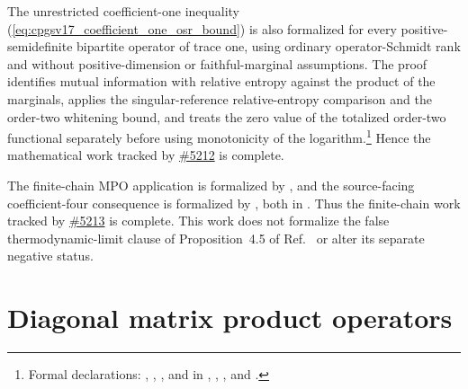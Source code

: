 \documentclass[11pt]{article}
\begin{document}
The unrestricted coefficient-one inequality
(\ref{eq:cpgsv17_coefficient_one_osr_bound}) is also formalized for every
positive-semidefinite bipartite operator of trace one, using ordinary
operator-Schmidt rank and without positive-dimension or faithful-marginal
assumptions. The proof identifies mutual information with relative entropy
against the product of the marginals, applies the singular-reference
relative-entropy comparison and the order-two whitening bound, and treats the
zero value of the totalized order-two functional separately before using
monotonicity of the logarithm.\footnote{Formal declarations:
,
,
, and
 in
,
,
, and
.}
Hence the mathematical work tracked by
\href{https://github.com/LionSR/TNLean/issues/5212}{\#5212} is complete.

The finite-chain MPO application is formalized by
, and the source-facing
coefficient-four consequence is formalized by
, both in
. Thus the finite-chain work tracked
by \href{https://github.com/LionSR/TNLean/issues/5213}{\#5213} is complete.
This work does not formalize the false thermodynamic-limit clause of
Proposition~4.5 of Ref.~\cite{Cirac2016MPDO_arXiv} or alter its separate
negative status.

\section{Diagonal matrix product operators}
\end{document}
